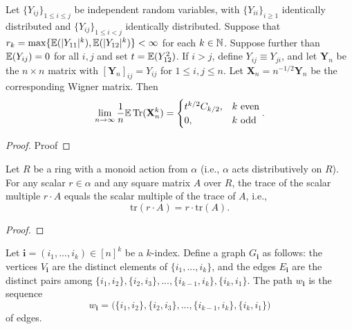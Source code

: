 \begin{proposition}
  \label{prop:matrix_moments_convergence}
  \notready
  Let $\{Y_{ij}\}_{1\le i\le j}$ be independent random variables, with $\{Y_{ii}\}_{i\ge 1}$ identically distributed and $\{Y_{ij}\}_{1\le i<j}$ identically distributed.  Suppose that $r_k = \max\{{\mathbb{E}}(|Y_{11}|^k),{\mathbb{E}}(|Y_{12}|^k)\} <\infty$ for each $k\in{\mathbb{N}}$.  Suppose further than ${\mathbb{E}}(Y_{ij})=0$ for all $i,j$ and set $t={\mathbb{E}}(Y_{12}^2)$.  If $i>j$, define $Y_{ij} \equiv Y_{ji}$, and let $\mathbf{Y}_n$ be the $n\times n$ matrix with $[\mathbf{Y}_n]_{ij} = Y_{ij}$ for $1\le i,j\le n$.  Let $\mathbf{X}_n = n^{-1/2}\mathbf{Y}_n$ be the corresponding Wigner matrix.  Then
\[
\lim_{n\to\infty} \frac{1}{n}{\mathbb{E}}\operatorname{Tr}(\mathbf{X}_n^k) = \begin{cases}
  t^{k/2}C_{k/2}, & k\text{ even} \\
  0, & k\text{ odd}
\end{cases}.
\]
\end{proposition}

\begin{proof}
\notready
Proof
\end{proof}

\iffalse

\begin{lemma}\label{lem:trace_smul}
  \mathlibok %
  Let $R$ be a ring with a monoid action from $\alpha$ (i.e., $\alpha$ acts distributively on $R$).
  For any scalar $r \in \alpha$ and any square matrix $A$ over $R$, the trace of the scalar
  multiple $r \cdot A$ equals the scalar multiple of the trace of $A$, i.e.,
  \[ \text{tr}(r \cdot A) = r \cdot \text{tr}(A). \]
  \end{lemma}

  \begin{proof}\leanok %
  \end{proof}

\begin{definition}
  \label{def:}
  \maybelean
  Let $\mathbf{i} = (i_1,...,i_k) \in [n]^k$ be a $k$-index. Define a graph $G_\mathbf{i}$ as follows: the
  vertices $V_\mathbf{i}$ are the distinct elements of $\{i_1,...,i_k\}$, and the edges $E_\mathbf{i}$ are
  the distinct pairs among $\{i_1,i_2\},\{i_2,i_3\},...,\{i_{k-1},i_k\},\{i_k,i_1\}$. The path
  $w_\mathbf{i}$ is the sequence
  $$w_\mathbf{i} = \bigl( \{i_1,i_2\},\{i_2,i_3\},...,\{i_{k-1},i_k\},\{i_k,i_1\} \bigl)$$
  of edges.
\end{definition}

